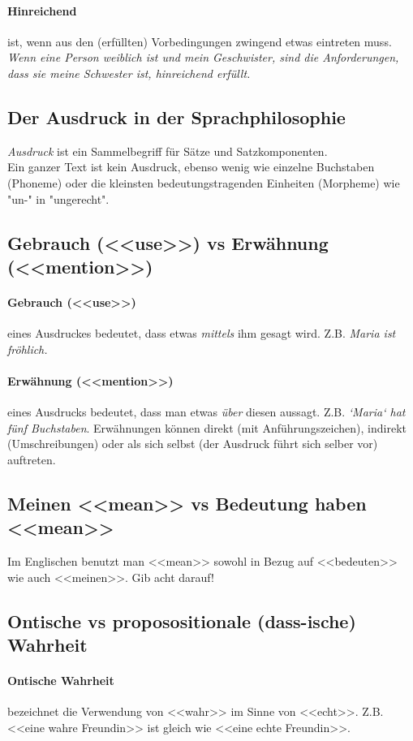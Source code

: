 \documentclass[../main.tex]{subfiles}
\begin{document}
\paragraph{Hinreichend} ist, wenn aus den (erfüllten) Vorbedingungen zwingend etwas eintreten muss. \textit{Wenn eine Person weiblich ist und mein Geschwister, sind die Anforderungen, dass sie meine Schwester ist, hinreichend erfüllt.} 

\subsection{Der Ausdruck in der Sprachphilosophie}
\emph{Ausdruck} ist ein Sammelbegriff für Sätze und Satzkomponenten. 
\\Ein ganzer Text ist kein Ausdruck, ebenso wenig wie einzelne Buchstaben (Phoneme) oder die kleinsten bedeutungstragenden Einheiten (Morpheme) wie "un-" in "ungerecht".

\subsection{Gebrauch (<<use>>) vs Erwähnung (<<mention>>)}
\paragraph{Gebrauch (<<use>>)} eines Ausdruckes bedeutet, dass etwas \emph{mittels} ihm gesagt wird. Z.B. \textit{Maria ist fröhlich.}
\paragraph{Erwähnung (<<mention>>)} eines Ausdrucks bedeutet, dass man etwas \emph{über} diesen aussagt. Z.B. \textit{`Maria` hat fünf Buchstaben}. Erwähnungen können direkt (mit Anführungszeichen), indirekt (Umschreibungen) oder als sich selbst (der Ausdruck führt sich selber vor) auftreten. 

\subsection{Meinen <<mean>> vs Bedeutung haben <<mean>>}
Im Englischen benutzt man <<mean>> sowohl in Bezug auf <<bedeuten>> wie auch <<meinen>>. Gib acht darauf!

\subsection{Ontische vs proposositionale (dass-ische) Wahrheit}
\paragraph{Ontische Wahrheit} bezeichnet die Verwendung von <<wahr>> im Sinne von <<echt>>. Z.B. <<eine wahre Freundin>> ist gleich wie <<eine echte Freundin>>. 
\end{document}
